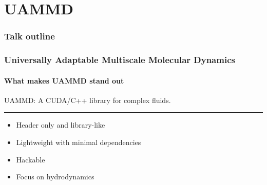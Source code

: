 \documentclass[xcolor=dvipsnames, compress]{beamer}
\begin{document}
\section{UAMMD}
\begin{frame}
  \frametitle{Talk outline}
  \tableofcontents[
  sectionstyle=show/shaded,
  subsectionstyle=show/show/hide,
  subsubsectionstyle=show/show/show/hide
  ]
\end{frame}

\begin{frame}
  \frametitle{Universally Adaptable Multiscale Molecular Dynamics}
  \framesubtitle{What makes UAMMD stand out}
  \Large
  \begin{center}
    UAMMD: A CUDA/C++ library for complex fluids.
    \rule{0.7\textwidth}{1.4pt}
  \end{center}
  \begin{itemize}
  \item<1-> Header only and library-like
  \item<2-> Lightweight with minimal dependencies
  \item<3-> Hackable
  \item<4-> Focus on hydrodynamics
  \end{itemize}
\end{frame}
\end{document}
